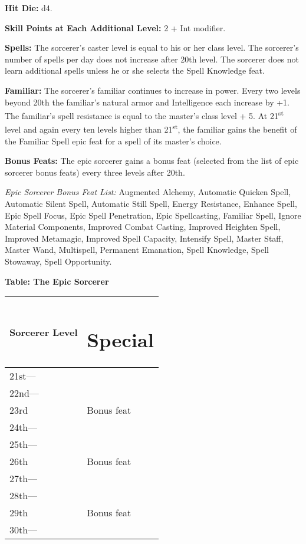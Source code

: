 \documentclass{article}
\begin{document}
\textbf{Hit Die:} d4. 

\textbf{Skill Points at Each Additional Level:} 2 + Int modifier. 

\textbf{Spells:} The sorcerer's caster level is equal to his or her class level. 
The sorcerer's number of spells per day does not increase after 20th level. The 
sorcerer does not learn additional spells unless he or she selects the Spell Knowledge 
feat. 

\textbf{Familiar:} The sorcerer's familiar continues to increase in power. Every 
two levels beyond 20th the familiar's natural armor and Intelligence each increase 
by +1. The familiar's spell resistance is equal to the master's class level + 5. 
At 21\textsuperscript{st} level and again every ten levels higher than 21\textsuperscript{st}, 
the familiar gains the benefit of the Familiar Spell epic feat for a spell of its 
master's choice.

\textbf{Bonus Feats:} The epic sorcerer gains a bonus feat (selected from the list 
of epic sorcerer bonus feats) every three levels after 20th. 

\textit{Epic Sorcerer Bonus Feat List: }Augmented Alchemy, Automatic Quicken Spell, 
Automatic Silent Spell, Automatic Still Spell, Energy Resistance, Enhance Spell, 
Epic Spell Focus, Epic Spell Penetration, Epic Spellcasting, Familiar Spell, Ignore 
Material Components, Improved Combat Casting, Improved Heighten Spell, Improved 
Metamagic, Improved Spell Capacity, Intensify Spell, Master Staff, Master Wand, 
Multispell, Permanent Emanation, Spell Knowledge, Spell Stowaway, Spell Opportunity. 

\textbf{Table: The Epic Sorcerer }

\begin{tabular}{|>{\raggedright}p{47pt}|>{\raggedright}p{60pt}|}
\hline
S\textbf{orcerer Level} & \section*{S\textbf{pecial }}\tabularnewline
\hline
21st--- &  \tabularnewline
\hline
22nd--- &  \tabularnewline
\hline
23rd & Bonus feat \tabularnewline
\hline
24th--- &  \tabularnewline
\hline
25th--- &  \tabularnewline
\hline
26th & Bonus feat \tabularnewline
\hline
27th--- &  \tabularnewline
\hline
28th--- &  \tabularnewline
\hline
29th & Bonus feat \tabularnewline
\hline
30th--- & \tabularnewline
\hline
\end{tabular}

\vspace{24pt}
\end{document}
